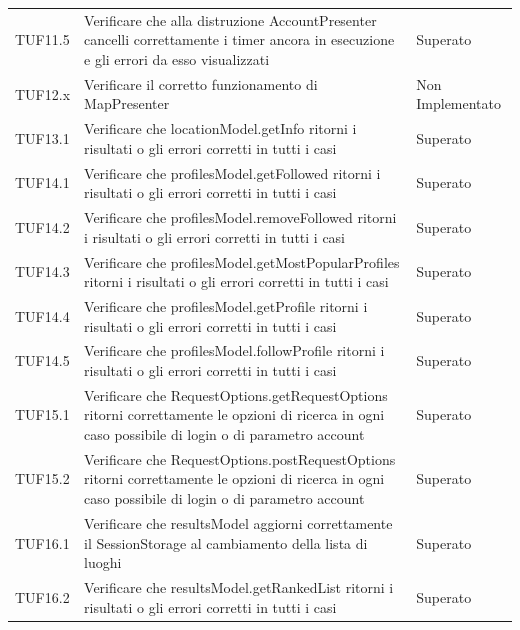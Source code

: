 {\begin{longtable}{C{.3\freewidth} C{.5\freewidth} C{.3\freewidth}}
        TUF11.5 & Verificare che alla distruzione AccountPresenter cancelli correttamente i timer ancora in esecuzione 
                e gli errori da esso visualizzati & Superato \\

        TUF12.x & Verificare il corretto funzionamento di MapPresenter & Non Implementato \\

        TUF13.1 & Verificare che locationModel.getInfo ritorni i risultati o gli errori corretti in tutti i casi & Superato \\

        TUF14.1 & Verificare che profilesModel.getFollowed ritorni i risultati o gli errori corretti in tutti i casi & Superato \\

        TUF14.2 & Verificare che profilesModel.removeFollowed ritorni i risultati o gli errori corretti in tutti i casi & Superato \\

        TUF14.3 & Verificare che profilesModel.getMostPopularProfiles ritorni i risultati o gli errori corretti in tutti i casi & Superato \\

        TUF14.4 & Verificare che profilesModel.getProfile ritorni i risultati o gli errori corretti in tutti i casi & Superato \\

        TUF14.5 & Verificare che profilesModel.followProfile ritorni i risultati o gli errori corretti in tutti i casi & Superato \\

        TUF15.1 & Verificare che RequestOptions.getRequestOptions ritorni correttamente le opzioni di ricerca 
                in ogni caso possibile di login o di parametro account & Superato \\

        TUF15.2 & Verificare che RequestOptions.postRequestOptions ritorni correttamente le opzioni di ricerca 
                in ogni caso possibile di login o di parametro account & Superato \\

        TUF16.1 & Verificare che resultsModel aggiorni correttamente il SessionStorage al cambiamento della lista di luoghi & Superato \\

        TUF16.2 & Verificare che resultsModel.getRankedList ritorni i risultati o gli errori corretti in tutti i casi & Superato \\


\end{longtable}}
